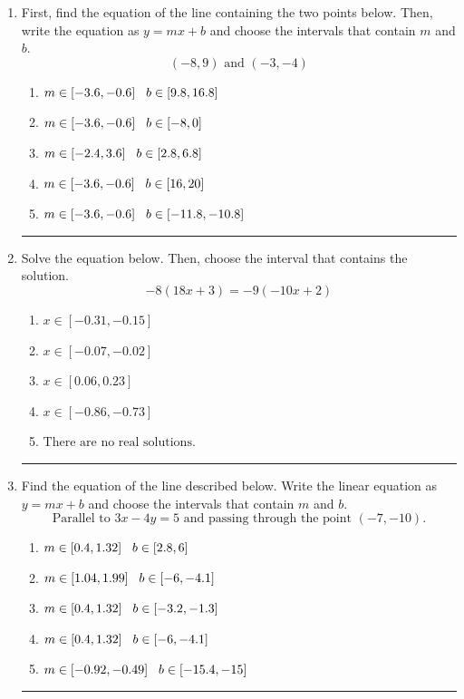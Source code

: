 \documentclass[14pt]{extbook}
\newcommand{\litem}[1]{\item#1\hspace*{-1cm}\rule{\textwidth}{0.4pt}}
\begin{document}
\begin{enumerate}
{\begin{enumerate}[label=\Alph*.]
\end{enumerate} }
\litem{
First, find the equation of the line containing the two points below. Then, write the equation as $ y=mx+b $ and choose the intervals that contain $m$ and $b$.\[ (-8, 9) \text{ and } (-3, -4) \]\begin{enumerate}[label=\Alph*.]
\item \( m \in [-3.6, -0.6] \hspace*{3mm} b \in [9.8, 16.8] \)
\item \( m \in [-3.6, -0.6] \hspace*{3mm} b \in [-8, 0] \)
\item \( m \in [-2.4, 3.6] \hspace*{3mm} b \in [2.8, 6.8] \)
\item \( m \in [-3.6, -0.6] \hspace*{3mm} b \in [16, 20] \)
\item \( m \in [-3.6, -0.6] \hspace*{3mm} b \in [-11.8, -10.8] \)

\end{enumerate} }
\litem{
Solve the equation below. Then, choose the interval that contains the solution.\[ -8(18x + 3) = -9(-10x + 2) \]\begin{enumerate}[label=\Alph*.]
\item \( x \in [-0.31, -0.15] \)
\item \( x \in [-0.07, -0.02] \)
\item \( x \in [0.06, 0.23] \)
\item \( x \in [-0.86, -0.73] \)
\item \( \text{There are no real solutions.} \)

\end{enumerate} }
\litem{
Find the equation of the line described below. Write the linear equation as $ y=mx+b $ and choose the intervals that contain $m$ and $b$.\[ \text{Parallel to } 3 x - 4 y = 5 \text{ and passing through the point } (-7, -10). \]\begin{enumerate}[label=\Alph*.]
\item \( m \in [0.4, 1.32] \hspace*{3mm} b \in [2.8, 6] \)
\item \( m \in [1.04, 1.99] \hspace*{3mm} b \in [-6, -4.1] \)
\item \( m \in [0.4, 1.32] \hspace*{3mm} b \in [-3.2, -1.3] \)
\item \( m \in [0.4, 1.32] \hspace*{3mm} b \in [-6, -4.1] \)
\item \( m \in [-0.92, -0.49] \hspace*{3mm} b \in [-15.4, -15] \)


\end{enumerate}}
\end{enumerate}
\end{document}
